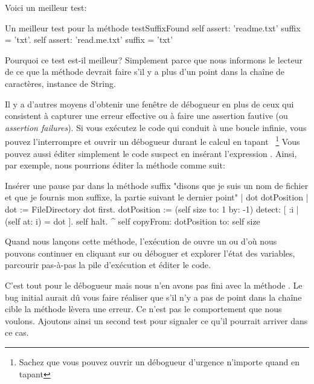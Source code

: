 \documentclass[a4paper,10pt,twoside]{book}
\begin{document}
Voici un meilleur test:

\begin{method}[testSuffix2]{Un meilleur test pour la méthode }
testSuffixFound
	self assert: 'readme.txt' suffix = 'txt'.
	self assert: 'read.me.txt' suffix = 'txt'
\end{method}
\noindent
Pourquoi ce test est-il meilleur? Simplement parce que
nous informons le lecteur de ce que la méthode devrait faire 
s'il y a plus d'un point dans la chaîne de caractères, instance de String.

Il y a d'autres moyens d'obtenir une fenêtre de débogueur en plus de ceux
qui consistent à capturer une erreur effective ou à faire une assertion
fautive (ou \emph{assertion failures}).
Si vous exécutez le code qui conduit à une boucle infinie, vous pouvez
l'interrompre et ouvrir un débogueur durant le calcul en tapant %
~\footnote{Sachez que vous pouvez ouvrir un débogueur d'urgence n'importe quand en tapant
}
Vous pouvez aussi éditer simplement le code suspect en insérant l'expression .
Ainsi, par exemple, nous pourrions éditer la méthode  comme suit:

\needspace{11ex}
\begin{method}[suffix]{Insérer une pause par  dans la méthode }
suffix
	"disons que je suis un nom de fichier et que je fournis mon suffixe, la partie suivant le dernier point"
	| dot dotPosition |
	dot := FileDirectory dot first.
	dotPosition := (self size to: 1 by: -1) detect: [ :i | (self at: i) = dot ].
	self halt.
	^ self copyFrom: dotPosition to: self size 
\end{method}

Quand nous lançons cette méthode, l'exécution de  ouvre 
un  ou \emph{} d'où nous pouvons continuer 
en cliquant sur 
ou déboguer et explorer l'état des variables, parcourir pas-à-pas la pile d'exécution et éditer le code.

C'est tout pour le débogueur mais nous n'en avons pas fini avec la méthode .
Le bug initial aurait dû vous faire réaliser que s'il n'y a pas de point dans la chaîne 
cible la méthode  lèvera une erreur.
Ce n'est pas le comportement que nous voulons. Ajoutons ainsi un second test
pour signaler ce qu'il pourrait arriver dans ce cas.  
\end{document}
